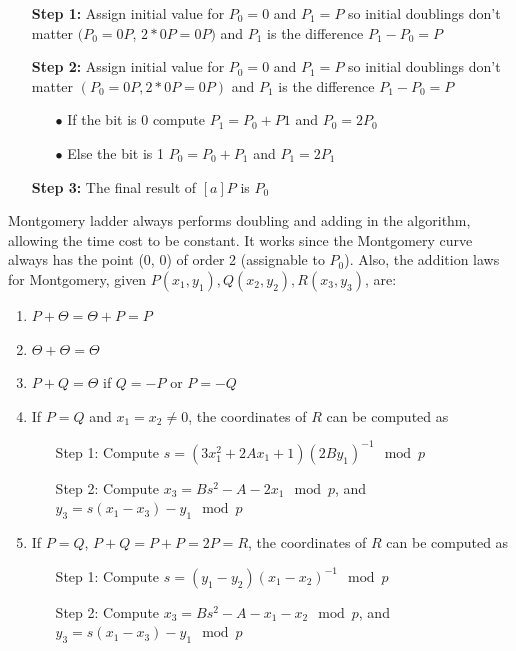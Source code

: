 \begin{itemize}[leftmargin=2.5cm]
  \item[\textbf{Step 1:}] Assign initial value for $P_0 = 0$ and $P_1 = P$ so initial doublings don’t matter $(P_0 =0P$, $2*0P = 0P)$ and $P_1$ is the difference $P_1 - P_0 = P$
  \item[\textbf{Step 2:}] Assign initial value for $P_0 = 0$ and $P_1 = P$ so initial doublings don’t matter $(P_0 =0P, 2*0P = 0P)$ and $P_1$ is the difference $P_1 - P_0 = P$

        \begin{itemize}
          \item[$\bullet$] If the bit is 0 compute $P_1 = P_0 +  P1$ and $P_0 = 2P_0$
          \item[$\bullet$] Else the bit is 1 $P_0 = P_0 +  P_1$ and $P_1 = 2P_1$
        \end{itemize}

  \item[\textbf{Step 3:}] The final result of $[a]P$ is $P_0$
\end{itemize}

Montgomery ladder always performs doubling and adding in the algorithm, allowing the time cost to be constant. It works since the Montgomery curve always has the point (0, 0) of order 2 (assignable to $P_0$). Also, the addition laws for Montgomery, given $P(x_1, y_1), Q(x_2, y_2), R(x_3, y_3)$, are:

\begin{enumerate}
  \item $P + \Theta = \Theta + P = P$
  \item $\Theta + \Theta = \Theta$
  \item $P + Q = \Theta$ if $Q = -P$ or $P = -Q$
  \item If $P = Q$ and $x_1 = x_2 \neq 0$, the coordinates of $R$ can be computed as

        \begin{itemize}[leftmargin=2cm]
          \item[Step 1:] Compute $s = (3x_1^2 + 2Ax_1 + 1) (2By_1)^{-1} \mod p$
          \item[Step 2:] Compute $x_3 = Bs^2 - A - 2x_1 \mod p$, and $y_3 = s(x_1 - x_3) - y_1 \mod p$
        \end{itemize}

  \item If $P = Q$, $P + Q = P + P = 2P = R$, the coordinates of $R$ can be computed as

        \begin{itemize}[leftmargin=2cm]
          \item[Step 1:] Compute $s = (y_1 - y_2) (x_1 - x_2)^{-1} \mod p$
          \item[Step 2:] Compute $x_3 = Bs^2 - A - x_1 - x_2 \mod p$, and $y_3 = s(x_1 - x_3) - y_1 \mod p$
        \end{itemize}
\end{enumerate}

